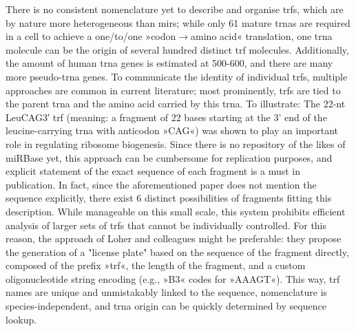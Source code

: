 There is no consistent nomenclature yet to describe and organise \acp{trf}, which are by nature more heterogeneous than \acp{mir}; while only 61 mature \acp{trna} are required in a cell to achieve a one\-/to\-/one »codon$\to$amino acid« translation, one \ac{trna} molecule can be the origin of several hundred distinct \ac{trf} molecules. Additionally, the amount of human \ac{trna} genes is estimated at 500-600\cite{Parisien2013}, and there are many more pseudo-\ac{trna} genes. To communicate the identity of individual \acp{trf}, multiple approaches are common in current literature; most prominently, \acp{trf} are tied to the parent \ac{trna} and the amino acid carried by this \ac{trna}. To illustrate: The 22-nt LeuCAG3′ \ac{trf} (meaning: a fragment of 22 bases starting at the 3' end of the leucine-carrying \ac{trna} with anticodon »CAG«) was shown to play an important role in regulating ribosome biogenesis\cite{Kim2017}. Since there is no repository of the likes of miRBase yet, this approach can be cumbersome for replication purposes, and explicit statement of the exact sequence of each fragment is a must in publication. In fact, since the aforementioned paper does not mention the sequence explicitly, there exist 6 distinct possibilities of fragments fitting this description. While manageable on this small scale, this system prohibits efficient analysis of larger sets of \acp{trf} that cannot be individually controlled. For this reason, the approach of Loher and colleagues\cite{Loher2017} might be preferable: they propose the generation of a "license plate" based on the sequence of the fragment directly, composed of the prefix »\ac{trf}«, the length of the fragment, and a custom oligonucleotide string encoding (e.g., »B3« codes for »AAAGT«). This way, \ac{trf} names are unique and unmistakably linked to the sequence, nomenclature is species-independent, and \ac{trna} origin can be quickly determined by sequence lookup.



